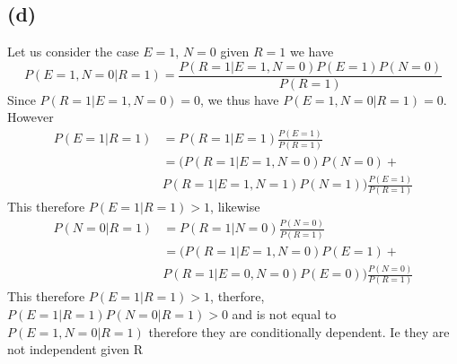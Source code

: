\documentclass[12pt]{article}
\begin{document}
\subsection*{(d)}
Let us consider the case $E=1$, $N=0$ given $R=1$ we have
$$P(E=1,N=0|R=1)=\frac{P(R=1|E=1,N=0)P(E=1)P(N=0)}{P(R=1)}$$
Since $P(R=1|E=1,N=0)=0$, we thus have $P(E=1,N=0|R=1)=0$. However 
\begin{align*}
    P(E=1|R=1)&=P(R=1|E=1)\frac{P(E=1)}{P(R=1)}\\
    &=(P(R=1|E=1,N=0)P(N=0)+\\
    &P(R=1|E=1,N=1)P(N=1))\frac{P(E=1)}{P(R=1)}
\end{align*}
This therefore $P(E=1|R=1)>1$, likewise
\begin{align*}
    P(N=0|R=1)&=P(R=1|N=0)\frac{P(N=0)}{P(R=1)}\\
    &=(P(R=1|E=1,N=0)P(E=1)+\\
    &P(R=1|E=0,N=0)P(E=0))\frac{P(N=0)}{P(R=1)}
\end{align*}
This therefore $P(E=1|R=1)>1$, therfore, $P(E=1|R=1)P(N=0|R=1)>0$ and is not equal to $P(E=1,N=0|R=1)$ therefore they are conditionally dependent.
Ie they are not independent given R
\end{document}
